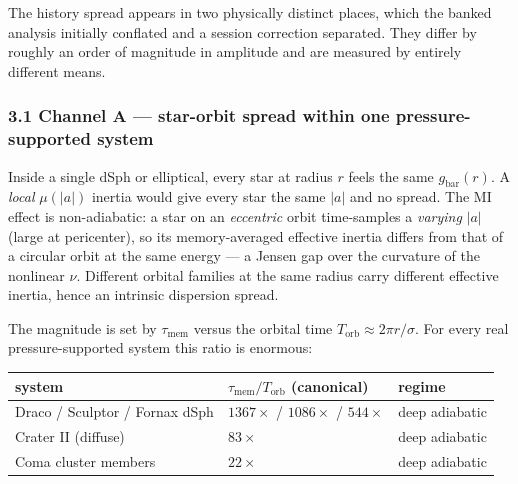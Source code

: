 \documentclass[
]{article}
\newcounter{none} %
\begin{document}
The history spread appears in two physically distinct places, which the
banked analysis initially conflated and a session correction separated.
They differ by roughly an order of magnitude in amplitude and are
measured by entirely different means.

\subsubsection{3.1 Channel A --- star-orbit spread within one
pressure-supported
system}\label{channel-a-star-orbit-spread-within-one-pressure-supported-system}

Inside a single dSph or elliptical, every star at radius \(r\) feels the
same \(g_\mathrm{bar}(r)\). A \emph{local} \(\mu(|a|)\) inertia would give
every star the same \(|a|\) and no spread. The MI effect is
non-adiabatic: a star on an \emph{eccentric} orbit time-samples a
\emph{varying} \(|a|\) (large at pericenter), so its memory-averaged
effective inertia differs from that of a circular orbit at the same
energy --- a Jensen gap over the curvature of the nonlinear \(\nu\).
Different orbital families at the same radius carry different effective
inertia, hence an intrinsic dispersion spread.

The magnitude is set by \(\tau_\mathrm{mem}\) versus the orbital time
\(T_\mathrm{orb}\approx2\pi r/\sigma\). For every real pressure-supported
system this ratio is enormous:

{\def\LTcaptype{none} %
\begin{longtable}[]{@{}
  >{\raggedright\arraybackslash}p{}
  >{\raggedright\arraybackslash}p{}
  >{\raggedright\arraybackslash}p{}@{}}
\toprule\noalign{}
\begin{minipage}[b]{\linewidth}\raggedright
system
\end{minipage} & \begin{minipage}[b]{\linewidth}\raggedright
\(\tau_\mathrm{mem}/T_\mathrm{orb}\) (canonical)
\end{minipage} & \begin{minipage}[b]{\linewidth}\raggedright
regime
\end{minipage} \\
\midrule\noalign{}
\endhead
\bottomrule\noalign{}
\endlastfoot
Draco / Sculptor / Fornax dSph & \(1367\times\) / \(1086\times\) /
\(544\times\) & deep adiabatic \\
Crater II (diffuse) & \(83\times\) & deep adiabatic \\
Coma cluster members & \(22\times\) & deep adiabatic \\
\end{longtable}
}
\end{document}
